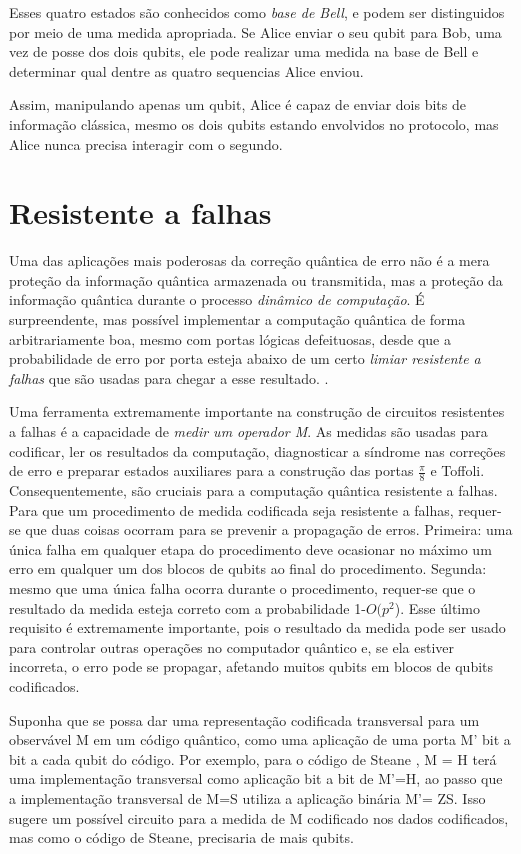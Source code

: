 \documentclass[tcc,capa]{texufpel}
\begin{document}
Esses quatro estados são conhecidos como \textit{base de Bell}, e podem ser distinguidos por meio de uma medida apropriada. Se Alice enviar o seu qubit para Bob, uma vez de posse dos dois qubits, ele pode realizar uma medida na base de Bell e determinar qual dentre as quatro sequencias Alice enviou.

Assim, manipulando apenas um qubit, Alice é capaz de enviar dois bits de informação clássica, mesmo os dois qubits estando envolvidos no protocolo, mas Alice nunca precisa interagir com o segundo.\cite{chuang00a}

\section{Resistente a falhas}
Uma das aplicações mais poderosas da correção quântica de erro não é a mera proteção da informação quântica armazenada ou transmitida, mas a proteção da informação quântica durante o processo \emph{dinâmico de computação}. É surpreendente, mas possível implementar a computação quântica de forma arbitrariamente boa, mesmo com portas lógicas defeituosas, desde que a probabilidade de erro por porta esteja abaixo de um certo \emph{limiar resistente a falhas} que são usadas para chegar a esse resultado. \cite{chuang00a}.


Uma ferramenta extremamente importante na construção de circuitos resistentes a falhas é a capacidade de \textit{ medir um operador M}. As medidas são usadas para codificar, ler os resultados da computação, diagnosticar a síndrome nas correções de erro e preparar estados auxiliares para a construção das portas $\frac{\pi}{8}$ e Toffoli. Consequentemente, são cruciais para a computação quântica resistente a falhas. Para que um procedimento de medida codificada seja resistente a falhas, requer-se que duas coisas ocorram para se prevenir a propagação de erros. Primeira: uma única falha em qualquer etapa do procedimento deve ocasionar no máximo um erro em qualquer um dos blocos de qubits ao final do procedimento. Segunda: mesmo que uma única falha ocorra durante o procedimento, requer-se que o resultado da medida esteja correto com a probabilidade 1-$O(p^2$). Esse último requisito é extremamente importante, pois o resultado da medida pode ser usado para controlar outras operações no computador quântico e, se ela estiver incorreta, o erro pode se propagar, afetando muitos qubits em blocos de qubits codificados. 

Suponha que se possa dar uma representação codificada transversal para um observável M em um código quântico, como uma aplicação de uma porta M' bit a bit a cada qubit do código. Por exemplo, para o código de Steane \cite{fowler2004constructing}, M = H terá uma implementação transversal como aplicação bit a bit de M'=H, ao passo que a implementação transversal de M=S utiliza a aplicação binária M'= ZS. Isso sugere um possível circuito para a medida de M codificado nos dados codificados, mas como o código de Steane, precisaria de mais qubits. 
\end{document}
